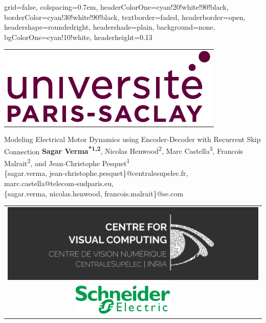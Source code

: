 \documentclass[landscape,a0paper,fontscale=0.292]{baposter}
\begin{document}
\begin{poster}{
 grid=false,
 colspacing=0.7em,
 headerColorOne=cyan!20!white!90!black,
 borderColor=cyan!30!white!90!black,
 textborder=faded,
 headerborder=open,
 headershape=roundedright,
 headershade=plain,
 background=none,
 bgColorOne=cyan!10!white,
 headerheight=0.13\textheight}
 {
   \begin{tabular}{c}
    \includegraphics[scale=0.45]{logo-ups} \\
   \end{tabular}
 }
 {\sc\Huge Modeling Electrical Motor Dynamics using Encoder-Decoder with Recurrent Skip Connection}
  {\textbf{Sagar Verma\textsuperscript{*1,2}}, Nicolas Henwood\textsuperscript{2}, Marc Castella\textsuperscript{3}, Francois Malrait\textsuperscript{2}, and Jean-Christophe Pesquet\textsuperscript{1} \\
  \{sagar.verma, jean-christophe.pesquet\}@centralesupelec.fr, marc.castella@telecom-sudparis.eu, \\
  \{sagar.verma, nicolas.henwood, francois.malrait\}@se.com
  }
  {
   \begin{tabular}{c c}
     \multicolumn{2}{c}{\includegraphics[scale=0.13]{logo_cvn}} \\
     \includegraphics[scale=0.37]{logo_se} &

\end{tabular}}
\end{poster}
\end{document}
